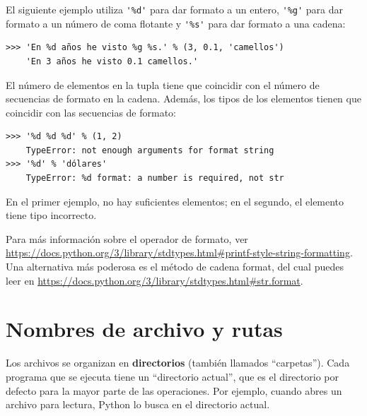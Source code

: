 \documentclass[10pt]{book}
\begin{document}
El siguiente ejemplo utiliza \verb"'%d'" para dar formato a un entero,
\verb"'%g'" para dar formato a un número de coma flotante y
\verb"'%s'" para dar formato a una cadena:

\begin{verbatim}
>>> 'En %d años he visto %g %s.' % (3, 0.1, 'camellos')
    'En 3 años he visto 0.1 camellos.'
\end{verbatim}
%
El número de elementos en la tupla tiene que coincidir con el número
de secuencias de formato en la cadena.  Además, los tipos de los
elementos tienen que coincidir con las secuencias de formato:

\begin{verbatim}
>>> '%d %d %d' % (1, 2)
    TypeError: not enough arguments for format string
>>> '%d' % 'dólares'
    TypeError: %d format: a number is required, not str
\end{verbatim}
%
En el primer ejemplo, no hay suficientes elementos; en el
segundo, el elemento tiene tipo incorrecto.

Para más información sobre el operador de formato, ver
\url{https://docs.python.org/3/library/stdtypes.html#printf-style-string-formatting}.  Una alternativa más poderosa es
el método de cadena format, del cual puedes leer en
\url{https://docs.python.org/3/library/stdtypes.html#str.format}.




\section{Nombres de archivo y rutas}
\label{paths}

Los archivos se organizan en {\bf directorios} (también llamados ``carpetas'').
Cada programa que se ejecuta tiene un ``directorio actual'', que es el
directorio por defecto para la mayor parte de las operaciones.
Por ejemplo, cuando abres un archivo para lectura, Python lo busca en el
directorio actual.
\end{document}
